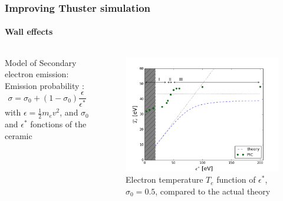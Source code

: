 \documentclass[sans, aspectratio=169]{beamer}
\begin{document}
\begin{frame} 
	\frametitle{Improving Thuster simulation} 
	\framesubtitle{ Wall effects} 
		
	\begin{columns}

		\begin{column}{0.45\linewidth}
	
		
	\begin{block}{Model of Secondary electron emission:}
	Emission probability : 
	$$\sigma = \sigma _0 + (1 - \sigma _0)\frac{\epsilon}{\epsilon^*}$$
	with $\epsilon = \frac{1}{2} m_e v^2$, and $\sigma_0$ and $\epsilon^*$ fonctions of the ceramic  
	\end{block}
		
		\end{column}
	
		\begin{column}{0.45\linewidth}
			\begin{figure}[hbtp]
				\centering
				\includegraphics[scale=0.3]{images/Te_epsilon.png}
				\caption{Electron temperature $T_e$ function of $\epsilon^*$, $\sigma_0 = 0.5$, compared to the actual theory}
			\end{figure}
		\end{column}


	\end{columns}
	
\end{frame}
\end{document}
